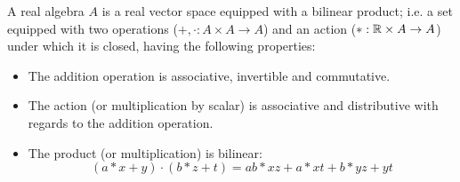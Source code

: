 \begin{definition}[Algebra]\label{d:algebra}
    A real algebra $A$ is a real vector space equipped with a bilinear product; i.e. a set equipped with two operations ($+, \cdot: A\times A \to A$) and an action ($*: \mathbb{R} \times A \to A$) under which it is closed, having the following properties:

	\begin{itemize}
		\item The addition operation is associative, invertible and commutative.
		\item The action (or multiplication by scalar) is associative and distributive with regards to the addition operation.
		\item The product (or multiplication) is bilinear:
				\[(a*x + y)\cdot (b*z + t) = ab*xz + a*xt + b*yz + yt\]
	\end{itemize}


\end{definition}

